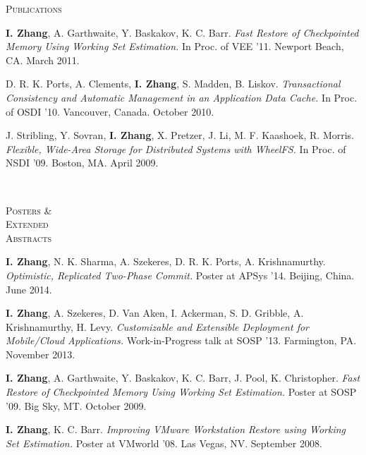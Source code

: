 \documentclass[10pt,times]{report}
\newlength{\sectiongap}
\newlength{\sectioncolwidth}
\newlength{\colgap}
\newlength{\stuffwidth}
\newenvironment{rtable}{
  \begin{minipage}{\textwidth}
  }{
  \end{minipage}
}
\newenvironment{rsection}[1]{
  \begin{minipage}[t]{\sectioncolwidth}
    \textsc{#1}
  \end{minipage}
  \hspace{\colgap}
  \begin{minipage}[t]{\stuffwidth}
  }{
    \removelastskip
  \end{minipage}
  \\[\sectiongap]
}
\begin{document}
\begin{rtable}
\begin{rsection}{Publications}
    \textbf{I. Zhang}, A. Garthwaite, Y. Baskakov, K. C. Barr. \textit{Fast
      Restore of Checkpointed Memory Using Working Set
      Estimation.} In Proc. of VEE '11. Newport Beach, CA. March
    2011.\\\vspace{-0.5em}

    D. R. K. Ports, A. Clements, \textbf{I. Zhang}, S. Madden,
    B. Liskov. \textit{Transactional Consistency and Automatic
      Management in an Application Data Cache.} In Proc. of OSDI
    '10. Vancouver, Canada. October 2010.\\\vspace{-0.5em}

    J. Stribling, Y. Sovran, \textbf{I. Zhang}, X. Pretzer, J. Li,
    M. F. Kaashoek, R. Morris. \textit{Flexible, Wide-Area Storage for
      Distributed Systems with WheelFS.} In Proc. of NSDI '09. Boston,
    MA. April 2009.
 \vspace{1.0em}
 \end{rsection}

  \begin{rsection}{Posters \&\\Extended\\Abstracts}
   \textbf{I. Zhang}, N. K. Sharma, A. Szekeres, D. R. K. Ports,
   A. Krishnamurthy. \textit{Optimistic, Replicated Two-Phase Commit.}
   Poster at APSys '14. Beijing, China. June 2014.\\\vspace{-0.5em}

    \textbf{I. Zhang}, A. Szekeres, D. Van Aken, I. Ackerman, S. D. Gribble,
   A. Krishnamurthy, H. Levy. \textit{Customizable and Extensible
     Deployment for Mobile/Cloud Applications.} Work-in-Progress talk
   at SOSP '13. Farmington, PA. November 2013.\\\vspace{-0.5em}

    \textbf{I. Zhang}, A. Garthwaite, Y. Baskakov, K. C. Barr, J. Pool,
    K. Christopher. \textit{Fast Restore of Checkpointed Memory Using
      Working Set Estimation.} Poster at SOSP '09. Big Sky,
    MT. October 2009.\\\vspace{-0.5em} 

   \textbf{I. Zhang}, K. C. Barr. \textit{Improving VMware Workstation Restore
      using Working Set Estimation.} Poster at VMworld '08. Las Vegas,
    NV. September 2008.
  \end{rsection}


\end{rtable}
\end{document}
